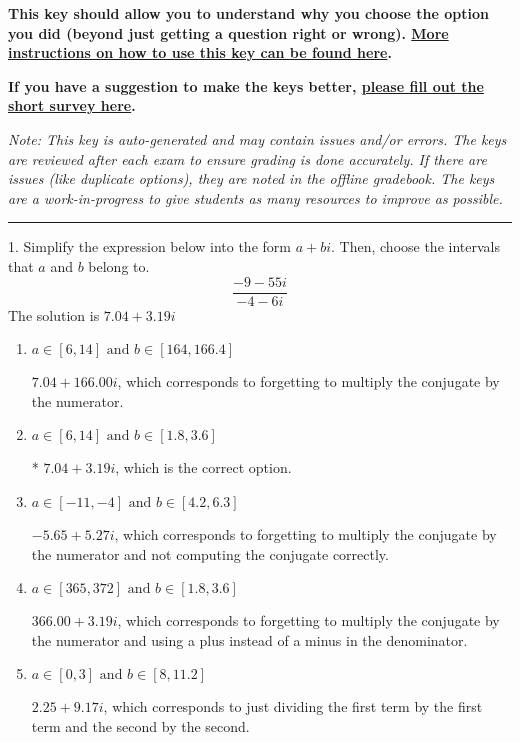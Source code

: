 \documentclass{extbook}[14pt]
\begin{document}
\textbf{This key should allow you to understand why you choose the option you did (beyond just getting a question right or wrong). \href{https://xronos.clas.ufl.edu/mac1105spring2020/courseDescriptionAndMisc/Exams/LearningFromResults}{More instructions on how to use this key can be found here}.}

\textbf{If you have a suggestion to make the keys better, \href{https://forms.gle/CZkbZmPbC9XALEE88}{please fill out the short survey here}.}

\textit{Note: This key is auto-generated and may contain issues and/or errors. The keys are reviewed after each exam to ensure grading is done accurately. If there are issues (like duplicate options), they are noted in the offline gradebook. The keys are a work-in-progress to give students as many resources to improve as possible.}

\rule{\textwidth}{0.4pt}

1. Simplify the expression below into the form $a+bi$. Then, choose the intervals that $a$ and $b$ belong to.
\[ \frac{-9  - 55 i}{-4  - 6 i} \] 
The solution is $ 7.04  + 3.19 i $ 

\begin{enumerate}[label=\Alph*.] 
\item $ a \in [6, 14] \text{ and } b \in [164, 166.4] $ 

  $7.04  + 166.00 i$, which corresponds to forgetting to multiply the conjugate by the numerator. 
\item $ a \in [6, 14] \text{ and } b \in [1.8, 3.6] $ 

 * $7.04  + 3.19 i$, which is the correct option. 
\item $ a \in [-11, -4] \text{ and } b \in [4.2, 6.3] $ 

  $-5.65  + 5.27 i$, which corresponds to forgetting to multiply the conjugate by the numerator and not computing the conjugate correctly. 
\item $ a \in [365, 372] \text{ and } b \in [1.8, 3.6] $ 

  $366.00  + 3.19 i$, which corresponds to forgetting to multiply the conjugate by the numerator and using a plus instead of a minus in the denominator. 
\item $ a \in [0, 3] \text{ and } b \in [8, 11.2] $ 

  $2.25  + 9.17 i$, which corresponds to just dividing the first term by the first term and the second by the second. 
\end{enumerate} 
 
\end{document}
